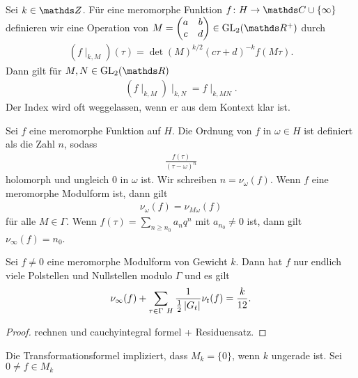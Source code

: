 \begin{defi}
Sei $k\in \Z$.
Für eine meromorphe Funktion $f \colon H \to \C \cup \{\infty\}$
definieren wir eine Operation von $M=\begin{pmatrix}
a&b\\
c&d
\end{pmatrix} \in \GL_2(\R^+)$
durch
\begin{align*}
(f\mid_{k,M})(\tau)=\det(M)^{k/2}(c\tau +d)^{-k} f(M\tau).
\end{align*}
Dann gilt für $M,N \in \GL_2(\R)$
\begin{align*}
(f\mid_{k,M})\mid_{k,N} =f \mid_{k,MN}.
\end{align*}
Der Index wird oft weggelassen, wenn er aus dem Kontext klar ist.
\end{defi}

\begin{defi}
Sei $f$ eine meromorphe Funktion auf $H$.
Die Ordnung von $f$ in $\omega \in H$ ist definiert als die Zahl $n$, sodass
\begin{align*}
\frac{f(\tau)}{(\tau-\omega)^n}
\end{align*}
holomorph und ungleich $0$ in $\omega$ ist.
Wir schreiben $n=\nu_\omega(f)$.
Wenn $f$ eine meromorphe Modulform ist, dann gilt
\begin{align*}
\nu_\omega(f)=\nu_{M\omega}(f)
\end{align*}
für alle $M \in \Gamma$.
Wenn $f(\tau)=\sum_{n\geq n_0} a_nq^n$ mit $a_{n_0}\not =0$ ist, dann gilt $\nu_\infty(f)=n_0$.
\end{defi}

\begin{thm}
Sei $f\not =0$ eine meromorphe Modulform von Gewicht $k$.
Dann hat $f$ nur endlich viele Polstellen und Nullstellen modulo $\Gamma$ und es gilt
\begin{align*}
\nu_\infty(f)+\sum_{\tau \in \Gamma \ H} \frac{1}{\frac{1}{2}\left\vert G_t\right\vert} \nu_t(f)=\frac{k}{12}.
\end{align*}
\end{thm}
\begin{proof}
rechnen und cauchyintegral formel + Residuensatz.
\end{proof}

\begin{bem}
Die Transformationsformel impliziert, dass $M_k=\{0\}$, wenn $k$ ungerade ist.
Sei $0 \not =f \in M_k$
\end{bem}

